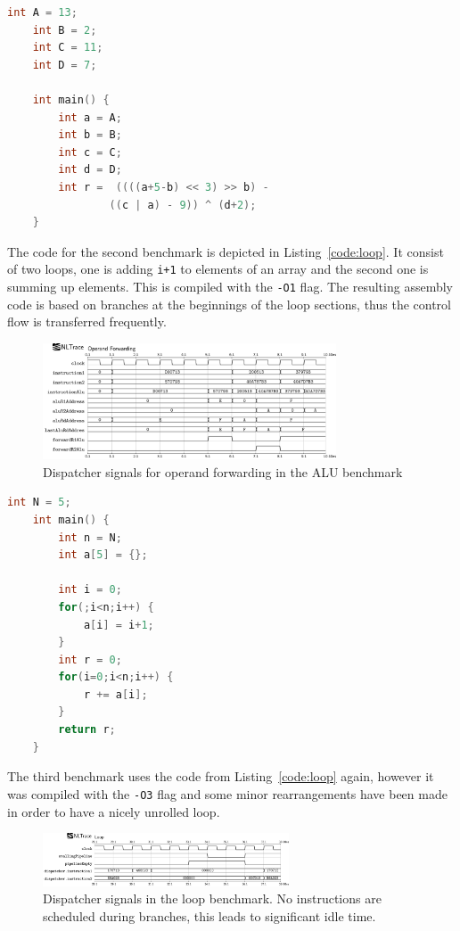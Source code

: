 \documentclass[conference]{IEEEtran}
\begin{document}
\begin{lstlisting}[language=C, caption=Code for the ALU benchmark, label=code:alu]
	int A = 13;
	int B = 2;
	int C = 11;
	int D = 7;

	int main() {
		int a = A;
		int b = B;
		int c = C;
		int d = D;
		int r =  ((((a+5-b) << 3) >> b) -
				((c | a) - 9)) ^ (d+2);
	}
\end{lstlisting}

The code for the second benchmark is depicted in Listing~\ref{code:loop}. It consist of two loops, one is adding \verb|i+1| to elements of an array and the second one is summing up elements. This is compiled with the \verb|-O1| flag. The resulting assembly code is based on branches at the beginnings of the loop sections, thus the control flow is transferred frequently.

\begin{figure}
	\centering
	\includegraphics[width=8.7cm]{vcd_forwarding.png}
	\caption{Dispatcher signals for operand forwarding in the ALU benchmark}
	\label{fig:vcd_alu}
\end{figure}


\begin{lstlisting}[language=C, caption=Code for the loop benchmark, label=code:loop]
	int N = 5;
	int main() {
		int n = N;
		int a[5] = {};

		int i = 0;
		for(;i<n;i++) {
			a[i] = i+1;
		}
		int r = 0;
		for(i=0;i<n;i++) {
			r += a[i];
		}
		return r;
	}
\end{lstlisting}

The third benchmark uses the code from Listing~\ref{code:loop} again, however it was compiled with the \verb|-O3| flag and some minor rearrangements have been made in order to have a nicely unrolled loop.


\begin{figure}
	\centering
	\includegraphics[width=0.65\textwidth]{vcd_loop.png}
	\caption{Dispatcher signals in the loop benchmark. No instructions are scheduled during branches, this leads to significant idle time.}
	\label{fig:vcd_loop}
\end{figure}
\end{document}
